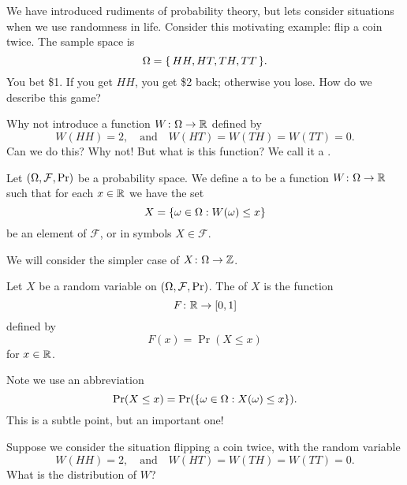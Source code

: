 \M
We have introduced rudiments of probability theory, but lets consider
situations when we use randomness in life. Consider this motivating
example: flip a coin twice. The sample space is
\begin{equation}
\Omega=\{\,HH,HT,TH,TT\,\}.
\end{equation}
You bet \$1. If you get $HH$, you get \$2 back; otherwise you lose. How
do we describe this game?

Why not introduce a function $W\colon\Omega\to\mathbb{R}$ defined by
\begin{equation}
W(HH)=2,\quad\mbox{and}\quad W(HT)=W(TH)=W(TT)=0.
\end{equation}
Can we do this? Why not! But what is this function? We call it a
.

Let $(\Omega,\mathcal{F},\mathop{\mathrm{Pr}}\nolimits)$ be a probability space. We define a
 to be a function $W\colon\Omega\to\mathbb{R}$
such that for each $x\in\mathbb{R}$ we have the set
\begin{equation}
X = \{ \omega\in\Omega : W(\omega)\leq x\}
\end{equation}
be an element of $\mathcal{F}$, or in symbols $X\in\mathcal{F}$. 

\begin{rmk}
We will consider the simpler case of 
$X\colon\Omega\to\mathbb{Z}$. 
\end{rmk}

Let $X$ be a random variable on $(\Omega,\mathcal{F},\mathop{\mathrm{Pr}}\nolimits)$. The
 of $X$ is the function
\begin{equation}
F\colon\mathbb{R}\to[0,1]
\end{equation}
defined by
\begin{equation}
F(x)=\Pr(X\leq x)
\end{equation}
for $x\in\mathbb{R}$.

Note we use an abbreviation
\begin{equation}
\mathop{\mathrm{Pr}}\nolimits(X\leq x)=\mathop{\mathrm{Pr}}\nolimits(\{\omega\in\Omega : X(\omega)\leq x\}).
\end{equation}
This is a subtle point, but an important one!

Suppose we consider the situation flipping a coin twice, with the random
variable
\begin{equation}
W(HH)=2,\quad\mbox{and}\quad W(HT)=W(TH)=W(TT)=0.
\end{equation}
What is the distribution of $W$?

